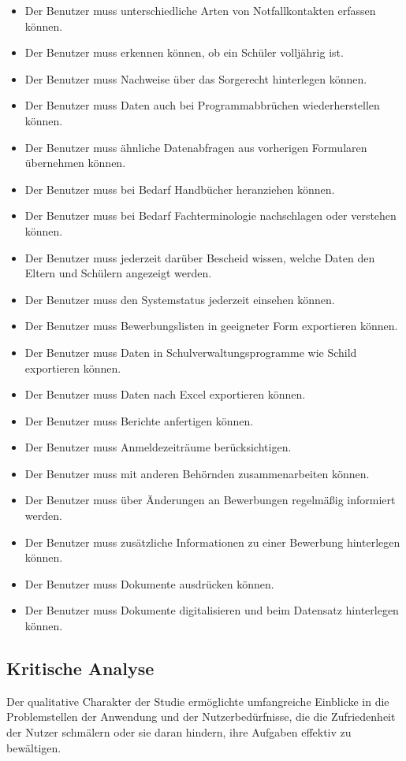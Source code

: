 \begin{itemize}
     \item Der Benutzer muss unterschiedliche Arten von Notfallkontakten erfassen können.
     \item Der Benutzer muss erkennen können, ob ein Schüler volljährig ist.
     \item Der Benutzer muss Nachweise über das Sorgerecht hinterlegen können.
     \item Der Benutzer muss Daten auch bei Programmabbrüchen wiederherstellen können.
     \item Der Benutzer muss ähnliche Datenabfragen aus vorherigen Formularen übernehmen können.
     \item Der Benutzer muss bei Bedarf Handbücher heranziehen können.
     \item Der Benutzer muss bei Bedarf Fachterminologie nachschlagen oder verstehen können.
     \item Der Benutzer muss jederzeit darüber Bescheid wissen, welche Daten den Eltern und Schülern angezeigt werden.
     \item Der Benutzer muss den Systemstatus jederzeit einsehen können.
     \item Der Benutzer muss Bewerbungslisten in geeigneter Form exportieren können.
     \item Der Benutzer muss Daten in Schulverwaltungsprogramme wie Schild exportieren können.
     \item Der Benutzer muss Daten nach Excel exportieren können.
     \item Der Benutzer muss Berichte anfertigen können.
     \item Der Benutzer muss Anmeldezeiträume berücksichtigen.
     \item Der Benutzer muss mit anderen Behörnden zusammenarbeiten können.
     \item Der Benutzer muss über Änderungen an Bewerbungen regelmäßig informiert werden.
     \item Der Benutzer muss zusätzliche Informationen zu einer Bewerbung hinterlegen können.
     \item Der Benutzer muss Dokumente ausdrücken können.
     \item Der Benutzer muss Dokumente digitalisieren und beim Datensatz hinterlegen können.
\end{itemize}

\subsection{Kritische Analyse}
Der qualitative Charakter der Studie ermöglichte umfangreiche Einblicke in die Problemstellen der Anwendung und der Nutzerbedürfnisse, die die Zufriedenheit der Nutzer schmälern oder sie daran hindern, ihre Aufgaben effektiv zu bewältigen. 

